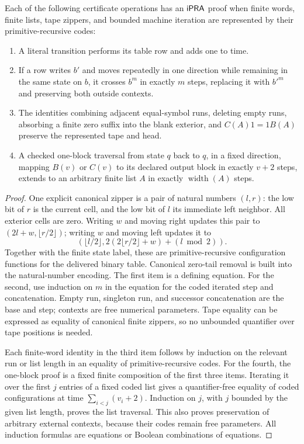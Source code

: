 \begin{lemma}
Each of the following certificate operations has an $\mathsf{iPRA}$ proof when
finite words, finite lists, tape zippers, and bounded machine iteration are
represented by their primitive-recursive codes:
\begin{enumerate}
\item A literal transition performs its table row and adds one to time.
\item If a row writes $b'$ and moves repeatedly in one direction while
      remaining in the same state on $b$, it crosses $b^m$ in exactly $m$
      steps, replacing it with $b'^m$ and preserving both outside contexts.
\item The identities combining adjacent equal-symbol runs, deleting empty
      runs, absorbing a finite zero suffix into the blank exterior, and
      $C(A)1=1B(A)$ preserve the represented tape and head.
\item A checked one-block traversal from state $q$ back to $q$, in a fixed
      direction, mapping $B(v)$ or $C(v)$ to its declared output block in
      exactly $v+2$ steps, extends to an arbitrary finite list $A$ in
      exactly $\operatorname{width}(A)$ steps.
\end{enumerate}
\end{lemma}
\begin{proof}
One explicit canonical zipper is a pair of natural numbers $(l,r)$:
the low bit of $r$ is the current cell, and the low bit of $l$ its immediate
left neighbor. All exterior cells are zero. Writing $w$ and moving right
updates this pair to $(2l+w,\lfloor r/2\rfloor)$; writing $w$ and moving
left updates it to
\[
 (\lfloor l/2\rfloor,
 2(2\lfloor r/2\rfloor+w)+(l\bmod2)).
\]
Together with the finite state label, these are primitive-recursive
configuration functions for the delivered binary table. Canonical
zero-tail removal is built into the natural-number encoding.
The first item is a defining equation. For the second, use induction on
$m$ in the equation for the coded iterated step and concatenation. Empty
run, singleton run, and successor concatenation are the base and step;
contexts are free numerical parameters. Tape equality can be expressed
as equality of canonical finite zippers, so no unbounded quantifier over
tape positions is needed.

Each finite-word identity in the third item follows by induction on the
relevant run or list length in an equality of primitive-recursive codes.
For the fourth, the one-block proof is a fixed finite composition of the
first three items. Iterating it over the first $j$ entries of a fixed
coded list gives a quantifier-free equality of coded configurations at
time $\sum_{i<j}(v_i+2)$. Induction on $j$, with $j$ bounded by the given
list length, proves the list traversal. This also proves preservation of
arbitrary external contexts, because their codes remain free parameters.
All induction formulas are equations or Boolean combinations of equations.
\end{proof}

